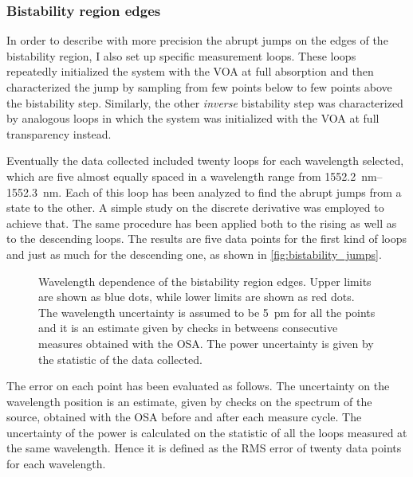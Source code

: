 \subsubsection{Bistability region edges}
\label{sssec:bistability_region_edges}
In order to describe with more precision the abrupt jumps on the edges of the bistability region, I also set up specific measurement loops.
These loops repeatedly initialized the system with the \ac{VOA} at full absorption and then characterized the jump by sampling from few points below to few points above the bistability step.
Similarly, the other \textit{inverse} bistability step was characterized by analogous loops in which the system was initialized with the VOA at full transparency instead.

Eventually the data collected included twenty loops for each wavelength selected, which are five almost equally spaced in a wavelength range from \SIrange{1552.2}{1552.3}{\nm}.
Each of this loop has been analyzed to find the abrupt jumps from a state to the other.
A simple study on the discrete derivative was employed to achieve that.
The same procedure has been applied both to the rising as well as to the descending loops.
The results are five data points for the first kind of loops and just as much for the descending one, as shown in \autoref{fig:bistability_jumps}.

\begin{figure}[!hbtp]
	\centering
	
	\caption{Wavelength dependence of the bistability region edges.
		Upper limits are shown as blue dots, while lower limits are shown as red dots.
		The wavelength uncertainty is assumed to be \SI{5}{\pm} for all the points and it is an estimate given by checks in betweens consecutive measures obtained with the OSA.
		The power uncertainty is given by the statistic of the data collected.%
	}
	\label{fig:bistability_jumps}
\end{figure}

The error on each point has been evaluated as follows.
The uncertainty on the wavelength position is an estimate, given by checks on the spectrum of the source, obtained with the \ac{OSA} before and after each measure cycle.
The uncertainty of the power is calculated on the statistic of all the loops measured at the same wavelength.
Hence it is defined as the RMS error of twenty data points for each wavelength.

